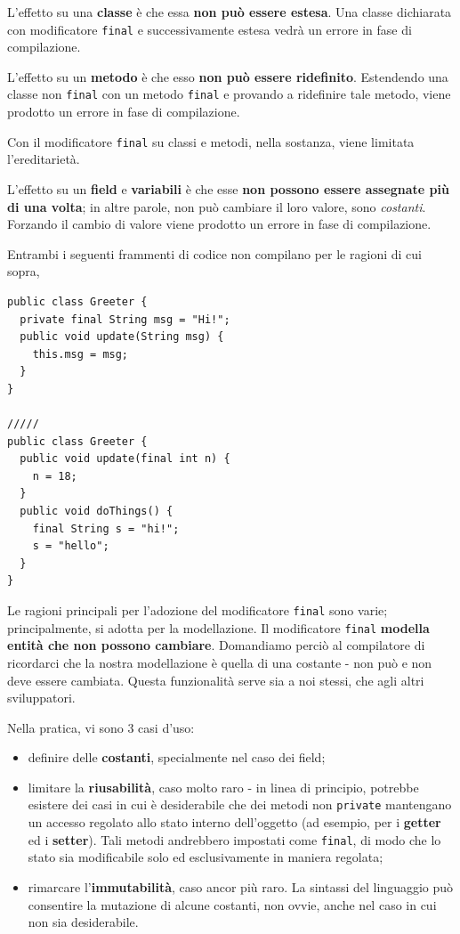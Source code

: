 \documentclass[\fontsizeclass,twocolumn]{\classname}
\theoremstyle{definition}
\theoremstyle{definition}
\begin{document}
L'effetto su una \textbf{classe} è che essa \textbf{non può essere estesa}. Una
classe dichiarata con modificatore \texttt{final} e successivamente estesa
vedrà un errore in fase di compilazione.

L'effetto su un \textbf{metodo} è che esso \textbf{non può essere ridefinito}.
Estendendo una classe non \texttt{final} con un metodo \texttt{final} e
provando a ridefinire tale metodo, viene prodotto un errore in fase di
compilazione.

Con il modificatore \texttt{final} su classi e metodi, nella sostanza, viene
limitata l'ereditarietà.

L'effetto su un \textbf{field} e \textbf{variabili} è che esse \textbf{non
possono essere assegnate più di una volta}; in altre parole, non può cambiare
il loro valore, sono \emph{costanti}. Forzando il cambio di valore viene
prodotto un errore in fase di compilazione.

Entrambi i seguenti frammenti di codice non compilano per le ragioni di cui
sopra,

\begin{lstlisting}
public class Greeter {
  private final String msg = "Hi!";
  public void update(String msg) {
    this.msg = msg;
  }
}

/////
public class Greeter {
  public void update(final int n) {
    n = 18;
  }
  public void doThings() {
    final String s = "hi!";
    s = "hello";
  }
}
\end{lstlisting}

Le ragioni principali per l'adozione del modificatore \texttt{final} sono
varie; principalmente, si adotta per la modellazione. Il modificatore
\texttt{final} \textbf{modella entità che non possono cambiare}. Domandiamo
perciò al compilatore di ricordarci che la nostra modellazione è quella di una
costante \-- non può e non deve essere cambiata. Questa funzionalità serve sia
a noi stessi, che agli altri sviluppatori.

Nella pratica, vi sono 3 casi d'uso:
\begin{itemize}
    \item definire delle \textbf{costanti}, specialmente nel caso dei field;
    \item limitare la \textbf{riusabilità}, caso molto raro \-- in linea di
        principio, potrebbe esistere dei casi in cui è desiderabile che dei
        metodi non \texttt{private} mantengano un accesso regolato allo stato
        interno dell'oggetto (ad esempio, per i \textbf{getter} ed i
        \textbf{setter}). Tali metodi andrebbero impostati come \texttt{final},
        di modo che lo stato sia modificabile solo ed esclusivamente in maniera
        regolata;
    \item rimarcare l'\textbf{immutabilità}, caso ancor più raro. La sintassi
        del linguaggio può consentire la mutazione di alcune costanti, non
        ovvie, anche nel caso in cui non sia desiderabile.
\end{itemize}
\end{document}

